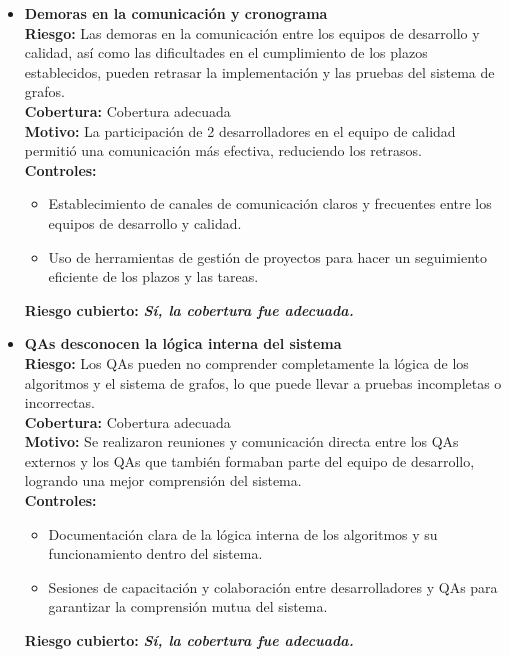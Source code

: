\documentclass[stu, 12pt, letterpaper, donotrepeattitle, floatsintext, natbib]{apa7}
\begin{document}
\begin{itemize}
    
    \item \textbf{Demoras en la comunicación y cronograma} \\ 
    \textbf{Riesgo:} Las demoras en la comunicación entre los equipos de desarrollo y calidad, así como las dificultades en el cumplimiento de los plazos establecidos, pueden retrasar la implementación y las pruebas del sistema de grafos. \\ 
    \textbf{Cobertura:} Cobertura adecuada \\ 
    \textbf{Motivo:} La participación de 2 desarrolladores en el equipo de calidad permitió una comunicación más efectiva, reduciendo los retrasos. \\ 
    \textbf{Controles:} 
    \begin{itemize}
      \item Establecimiento de canales de comunicación claros y frecuentes entre los equipos de desarrollo y calidad.
      \item Uso de herramientas de gestión de proyectos para hacer un seguimiento eficiente de los plazos y las tareas.
    \end{itemize}
    \textbf{Riesgo cubierto:} \textbf{\textit{Sí, la cobertura fue adecuada.}} 

    \item \textbf{QAs desconocen la lógica interna del sistema} \\ 
    \textbf{Riesgo:} Los QAs pueden no comprender completamente la lógica de los algoritmos y el sistema de grafos, lo que puede llevar a pruebas incompletas o incorrectas. \\ 
    \textbf{Cobertura:} Cobertura adecuada \\ 
    \textbf{Motivo:} Se realizaron reuniones y comunicación directa entre los QAs externos y los QAs que también formaban parte del equipo de desarrollo, logrando una mejor comprensión del sistema. \\ 
    \textbf{Controles:} 
    \begin{itemize}
      \item Documentación clara de la lógica interna de los algoritmos y su funcionamiento dentro del sistema.
      \item Sesiones de capacitación y colaboración entre desarrolladores y QAs para garantizar la comprensión mutua del sistema.
    \end{itemize}
    \textbf{Riesgo cubierto:} \textbf{\textit{Sí, la cobertura fue adecuada.}} 
    

\end{itemize}
\end{document}
